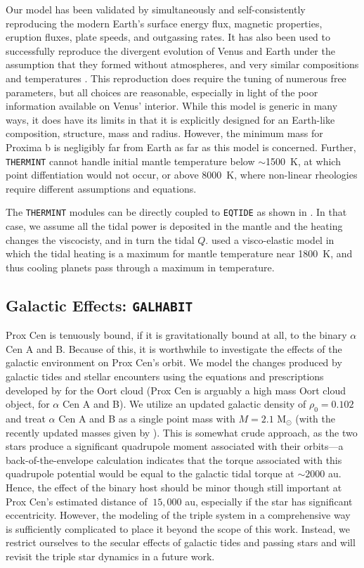 \documentclass[preprint,12pt]{aastex}
\def\eqtide{\texttt{\footnotesize{EQTIDE}}\xspace}
\def\thermint{\texttt{\footnotesize{THERMINT}}\xspace}
\def\galhabit{\texttt{\footnotesize{GALHABIT}}\xspace}
\begin{document}
Our model has been validated by simultaneously and self-consistently
reproducing the modern Earth's surface energy flux, magnetic
properties, eruption fluxes, plate speeds, and outgassing rates. It
has also been used to successfully reproduce the divergent evolution
of Venus and Earth under the assumption that they formed without
atmospheres, and very similar compositions and temperatures
\citep{DriscollBercovici13}. This reproduction does require the tuning of
numerous free parameters, but all choices are reasonable, especially
in light of the poor information available on Venus' interior. While
this model is generic in many ways, it does have its limits in that it is
explicitly designed for an Earth-like composition, structure, mass and
radius. However, the minimum mass for Proxima b is negligibly far from
Earth as far as this model is concerned. Further, \thermint cannot
handle initial mantle temperature below $\sim$1500~K, at which point
diffentiation would not occur, or above 8000~K, where non-linear
rheologies require different assumptions and equations.

The \thermint modules can be directly coupled to \eqtide as shown in
\citep{DriscollBarnes15}. In that case, we assume all the tidal power
is deposited in the mantle and the heating changes the viscocisty, and
in turn the tidal $Q$. \cite{DriscollBarnes15} used a visco-elastic
model in which the tidal heating is a maximum for mantle temperature
near 1800~K, and thus cooling planets pass through a maximum in
temperature.

\subsection{Galactic Effects: \galhabit}
\label{sec:models:galhabit}
Prox Cen is tenuously bound, if it is gravitationally bound at all, to 
the binary $\alpha$ Cen A and B. Because of this, it is worthwhile
to investigate the effects of the galactic environment on 
Prox Cen's orbit. We model the changes produced by galactic tides 
and stellar encounters using the equations and prescriptions 
developed by \cite{Heisler1986, Heisler1987, Rickman2008} 
for the Oort cloud (Prox Cen is arguably a high mass Oort cloud 
object, for $\alpha$ Cen A and B). We utilize an updated galactic 
density of $\rho_0 = 0.102$ \citep{Holmberg2000} and treat 
$\alpha$ Cen A and B as a single point mass with $M = 2.1$ 
M$_{\odot}$ (with the recently updated masses given by 
\cite{PourbaixBoffin16}). This is somewhat crude approach, as 
the two stars produce a significant quadrupole moment associated 
with their orbits---a back-of-the-envelope calculation indicates
that the torque associated with this quadrupole potential would 
be equal to the galactic tidal torque at $\sim 2000$ au. Hence, 
the effect of the binary host should be minor though still important 
at Prox Cen's estimated distance of $~15,000$ au, especially if 
the star has significant eccentricity. However, the modeling of the 
triple system in a comprehensive way is sufficiently complicated
\citep[see, i.e.][]{Harrington1968, Ford2000} to place it beyond 
the scope of this work. Instead, we restrict ourselves to the 
secular effects of galactic tides and passing stars 
and will revisit the triple star dynamics in a future work. 
\end{document}
